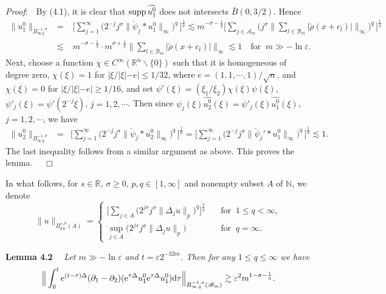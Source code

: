 \documentclass[11pt]{article}
\newcommand{\supp}{{\rm supp}}
\newcommand{\rmd}{\mbox{\rm d}}
\newcommand{\rme}{{\rm e}}
\begin{document}
  {\em Proof}:\ \ By (4.1), it is clear that $\supp\,\widehat{u_1^0}$ does not intersects $\bar{B}(0,3/2)$. Hence
\begin{eqnarray*}
  \|u_1^0\|_{B^{-1,\sigma}_{\infty\,q}}&=&\Big[\sum_{j=1}^{\infty}\Big(2^{-j}j^{\sigma}\|\check{\psi}_j\ast u_1^0\|_{\infty}\Big)^q\,\Big]^{\frac{1}{q}}
  \lesssim m^{-\sigma-\frac{1}{q}}\Big[\sum_{j\in\mathscr{A}_m}
  \Big(j^{\sigma}\Big\|\sum_{l\in\mathscr{B}_m}|\check{\rho}(x+c_l)|\Big\|_{\infty}\Big)^q\,\Big]^{\frac{1}{q}}
\\
  &\lesssim\; & m^{-\sigma-\frac{1}{q}}\cdot m^{\sigma+\frac{1}{q}}\Big\|\sum_{l\in\mathscr{B}_m}|\check{\rho}(x+c_l)|\Big\|_{\infty}
  \lesssim 1 \quad \mbox{for}\;\; m\gg-\ln\varepsilon.
\end{eqnarray*}
  Next, choose a function $\chi\in C^{\infty}(\mathbb{R}^n\backslash\{0\})$ such that it is homogeneous of degree zero, $\chi(\xi)=1$ for
  $|\xi/|\xi|-e|\leqslant 1/32$, where $e=(1,1,\cdots,1)/\sqrt{n}$, and $\chi(\xi)=0$ for $|\xi/|\xi|-e|\geqslant 1/16$, and set $\psi'(\xi)=
  (\xi_1/\xi_2)\chi(\xi)\psi(\xi)$, $\psi'_j(\xi)=\psi'(2^{-j}\xi)$, $j=1,2,\cdots$. Then since $\psi_j(\xi)\widehat{u_2^0}(\xi)=\psi'_j(\xi)
  \widehat{u_1^0}(\xi)$, $j=1,2,\cdots$, we have
\begin{eqnarray*}
  \|u_2^0\|_{B^{-1,\sigma}_{\infty\,q}}&=&\Big[\sum_{j=1}^{\infty}\Big(2^{-j}j^{\sigma}\|\check{\psi}_j\ast u_2^0\|_{\infty}\Big)^q\,\Big]^{\frac{1}{q}}
  =\Big[\sum_{j=1}^{\infty}\Big(2^{-j}j^{\sigma}\|\check{\psi}_j'\ast u_1^0\|_{\infty}\Big)^q\,\Big]^{\frac{1}{q}}
  \lesssim 1.
\end{eqnarray*}
  The last inequality follows from a similar argument as above. This proves the lemma. $\quad\Box$
\medskip

  In what follows, for $s\in\mathbb{R}$, $\sigma\geqslant 0$, $p,q\in[1,\infty]$ and nonempty subset $A$ of $\mathbb{N}$, we denote
$$
  \|u\|_{B^{s,\sigma}_{p\,q}(A)}=\left\{
\begin{array}{ll}
  \displaystyle\Big[\sum_{j\in A}\Big(2^{js}j^{\sigma}\|\Delta_j u\|_p\Big)^q\Big]^{\frac{1}{q}} \quad &\mbox{for}\;\; 1\leqslant q<\infty,
\\ [0.3cm]
  \displaystyle\sup_{j\in A}\Big(2^{js}j^{\sigma}\|\Delta_j u\|_p\Big) \quad &\mbox{for}\;\; q=\infty.
\end{array}
\right.
$$

  {\bf Lemma 4.2} \ \ {\em Let $m\gg-\ln\varepsilon$ and $t=\varepsilon2^{-32m}$. Then for any $1\leqslant q\leqslant\infty$ we have}
\begin{equation}
  \Big\|\int_0^t\rme^{(t-\tau)\Delta}(\partial_1-\partial_2)(\rme^{\tau\Delta}u_1^0\rme^{\tau\Delta}u_1^0)\rmd\tau
  \Big\|_{B^{-1,\sigma}_{\infty\,q}(\mathscr{B}_m)}\gtrsim\varepsilon^2 m^{1-\sigma-\frac{1}{q}}.
\end{equation}
\end{document}
